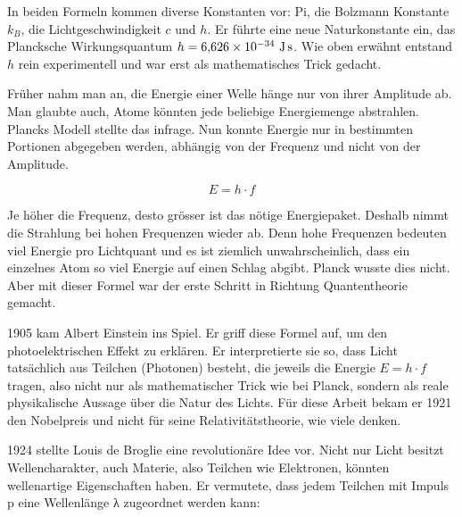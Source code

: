 	In beiden Formeln kommen diverse Konstanten vor: Pi, die Bolzmann Konstante $k_B$, die Lichtgeschwindigkeit $c$ und $h$. 
	Er führte eine neue Naturkonstante ein, das Plancksche Wirkungsquantum $h = 6{,}626 \times 10^{-34} \ \text{J\,s}$. 
	Wie oben erwähnt entstand $h$ rein experimentell und war erst als mathematisches Trick gedacht. 
	
	
	Früher nahm man an, die Energie einer Welle hänge nur von ihrer Amplitude ab. 
	Man glaubte auch, Atome könnten jede beliebige Energiemenge abstrahlen. Plancks Modell stellte das infrage. 
	Nun konnte Energie nur in bestimmten Portionen abgegeben werden, abhängig von der Frequenz und nicht von der Amplitude.
	
	
	\begin{equation}
		E = h \cdot f
	\end{equation}
	 
	 
	Je höher die Frequenz, desto grösser ist das nötige Energiepaket. 
	Deshalb nimmt die Strahlung bei hohen Frequenzen wieder ab. 
	Denn hohe Frequenzen bedeuten viel Energie pro Lichtquant und es ist ziemlich unwahrscheinlich, dass ein einzelnes Atom so viel Energie auf einen Schlag abgibt. 
	Planck wusste dies nicht. 
	Aber mit dieser Formel war der erste Schritt in Richtung  Quantentheorie gemacht.
	
	
	
	1905 kam Albert Einstein ins Spiel. 
	Er griff diese Formel auf, um den photoelektrischen Effekt zu erklären. 
	Er interpretierte sie so, dass Licht tatsächlich aus Teilchen (Photonen) besteht, die jeweils die Energie $E = h \cdot f$ tragen, also nicht nur als mathematischer Trick wie bei Planck, sondern als reale physikalische Aussage über die Natur des Lichts.
	Für diese Arbeit bekam er 1921 den Nobelpreis und nicht für seine Relativitätstheorie, wie viele denken.
	
	 
	
	

	
	1924 stellte Louis de Broglie eine revolutionäre Idee vor.
	Nicht nur Licht besitzt Wellencharakter, auch Materie, also Teilchen wie Elektronen, könnten wellenartige Eigenschaften haben.
	Er vermutete, dass jedem Teilchen mit Impuls p eine Wellenlänge λ zugeordnet werden kann:
	
